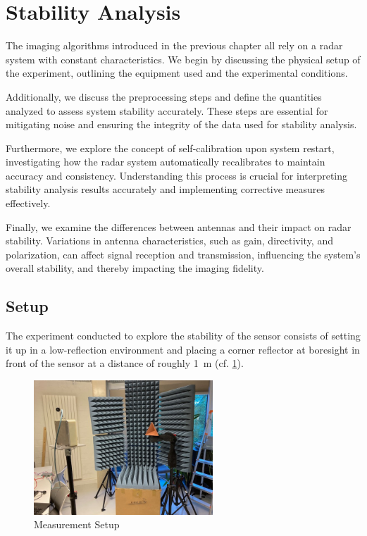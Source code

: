 \newpage
\section{Stability Analysis}
\label{sec:stability_analysis}

The imaging algorithms introduced in the previous chapter all rely on a radar system with constant characteristics.
We begin by discussing the physical setup of the experiment, outlining the equipment used and the experimental conditions. 

Additionally, we discuss the preprocessing steps and define the quantities analyzed to assess system stability accurately.
These steps are essential for mitigating noise and ensuring the integrity of the data used for stability analysis.

Furthermore, we explore the concept of self-calibration upon system restart,
investigating how the radar system automatically recalibrates to maintain accuracy and consistency.
Understanding this process is crucial for interpreting stability analysis results accurately and implementing corrective measures effectively.

Finally, we examine the differences between antennas and their impact on radar stability.
Variations in antenna characteristics, such as gain, directivity, and polarization,
can affect signal reception and transmission, influencing the system's overall stability,
and thereby impacting the imaging fidelity.



\subsection{Setup}

The experiment conducted to explore the stability of the sensor consists of setting it up
in a low-reflection environment and placing a corner reflector 
at boresight in front of the sensor at a distance of roughly \SI{1}{\m} (cf. \ref{fig:photo_setup}).

\begin{figure}
    \centering
    \includegraphics[width=0.6\textwidth]{../figures/aufbau1.jpg}
    \caption{Measurement Setup}
    \label{fig:photo_setup}
\end{figure}

